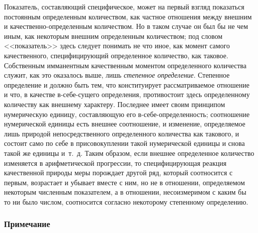 Показатель, составляющий специфическое, может на первый взгляд показаться
постоянным определенным количеством, как частное отношения между внешним и
качественно-определенным количеством. Но в таком случае он был бы не чем
иным, как некоторым внешним определенным количеством; под словом
<<показатель>> здесь следует понимать не что иное, как момент самого
качественного, специфицирующий определенное количество, как таковое.
Собственным имманентным качественным моментом определенного количества
служит, как это оказалось выше, лишь {\em степенное
определение}. Степенное определение и должно быть тем, что конституирует
рассматриваемое отношение и что, в качестве в-себе-сущего определения,
противостоит здесь определенному количеству как внешнему характеру.
Последнее имеет своим принципом нумерическую единицу, составляющую его
в-себе-определенность; соотношение нумерической единицы есть внешнее
соотношение, и изменение, определяемое лишь природой непосредственного
определенного количества как такового, и состоит само по себе в
присовокуплении такой нумерической единицы и снова такой же единицы и~т.~д.
Таким образом, если внешнее определенное количество изменяется в
арифметической прогрессии, то специфицирующая реакция качественной природы
меры порождает другой ряд, который соотносится с первым, возрастает и
убывает вместе с ним, но не в отношении, определяемом некоторым численным
показателем, а в отношении, несоизмеримом с каким бы то ни было числом,
соотносится согласно некоторому степенному определению.


\subsubsection[Примечание]{Примечание}

